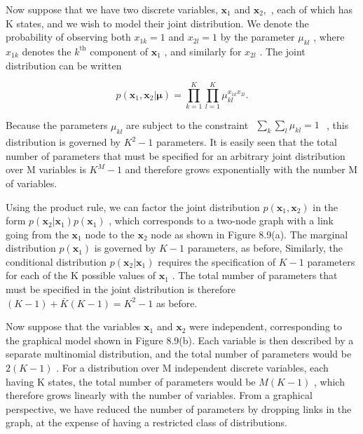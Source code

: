 \documentclass[
  10
]{article}
\begin{document}
Now suppose that we have two discrete variables,
\(\mathbf { x } _ { 1 }\) and \(\mathbf { x } _ { 2 } ,\) , each of
which has K states, and we wish to model their joint distribution. We
denote the probability of observing both \(x _ { 1 k } = 1\) and
\(x _ { 2 l } = 1\) by the parameter \(\mu _ { k l }\) , where
\(x _ { 1 k }\) denotes the \(k ^ { \mathrm { t h } }\) component of
\(\mathbf { x } _ { 1 }\) , and similarly for \(x _ { 2 l }\) . The
joint distribution can be written

\[
p (\mathbf {x} _ {1}, \mathbf {x} _ {2} | \boldsymbol {\mu}) = \prod_ {k = 1} ^ {K} \prod_ {l = 1} ^ {K} \mu_ {k l} ^ {x _ {1 k} x _ {2 l}}.
\]

Because the parameters \(\mu _ { k l }\) are subject to the constraint
\(\begin{array} { r } { \sum _ { k } \sum _ { l } \mu _ { k l } = 1 } \end{array}\)
, this distribution is governed by \(K ^ { 2 } - 1\) parameters. It is
easily seen that the total number of parameters that must be specified
for an arbitrary joint distribution over M variables is
\(K ^ { M } - 1\) and therefore grows exponentially with the number M of
variables.

Using the product rule, we can factor the joint distribution
\(p ( \mathbf { x } _ { 1 } , \mathbf { x } _ { 2 } )\) in the form
\(p ( \mathbf { x } _ { 2 } | \mathbf { x } _ { 1 } ) p ( \mathbf { x } _ { 1 } )\)
, which corresponds to a two-node graph with a link going from the
\(\mathbf { x } _ { 1 }\) node to the \(\mathbf { x } _ { 2 }\) node as
shown in Figure 8.9(a). The marginal distribution
\(p ( \mathbf { x } _ { 1 } )\) is governed by \(K - 1\) parameters, as
before, Similarly, the conditional distribution
\(p ( \mathbf { x } _ { 2 } | \mathbf { x } _ { 1 } )\) requires the
specification of \(K - 1\) parameters for each of the K possible values
of \(\mathbf { x } _ { 1 }\) . The total number of parameters that must
be specified in the joint distribution is therefore
\(( K - 1 ) + \bar { K } ( K - 1 ) = K ^ { 2 } - 1\) as before.

Now suppose that the variables \(\mathbf { x } _ { 1 }\) and
\(\mathbf { x } _ { 2 }\) were independent, corresponding to the
graphical model shown in Figure 8.9(b). Each variable is then described
by a separate multinomial distribution, and the total number of
parameters would be \(2 ( K - 1 )\) . For a distribution over M
independent discrete variables, each having K states, the total number
of parameters would be \(M ( K - 1 )\) , which therefore grows linearly
with the number of variables. From a graphical perspective, we have
reduced the number of parameters by dropping links in the graph, at the
expense of having a restricted class of distributions.
\end{document}
